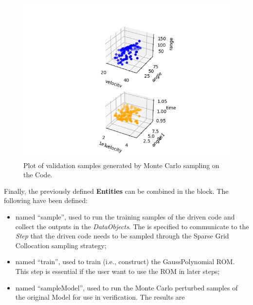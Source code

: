 \begin{enumerate}
 \begin{figure}[h!]
  \centering
  \includegraphics[scale=0.7]{../../tests/framework/user_guide/ForwardSamplingStrategies/gold/RunDir/SparseGrid/1-samplesModelPlot3D_scatter-scatter.png}
  \caption{Plot of validation samples generated by Monte Carlo sampling on the Code.}
  \label{fig:samplesSparseGridPlotModel}
 \end{figure}
   Finally, the previously defined \textbf{Entities} can be combined in
   the  block.
   The following  have been defined:
   \begin{itemize}
     \item {} named ``sample'', used to run the training
     samples of the driven code and
     collect the outputs in the \textit{DataObjects}.
     The  is specified to communicate to the
     \textit{Step} that the driven code needs to
     be sampled through the Sparse Grid Collocation sampling strategy;
     \item {} named ``train'', used to train (i.e.,
     construct) the GaussPolynomial ROM. This step is essential if the
     user want to use the ROM in later steps;
     \item {} named ``sampleModel'', used to run the
     Monte Carlo perturbed samples of the original Model for use in verification.  The results are

\end{itemize}
\end{enumerate}
